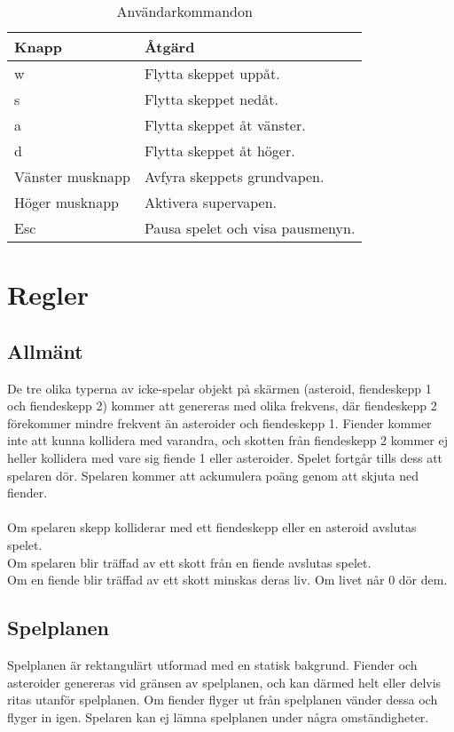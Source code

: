 \documentclass{TDP003mall}
\begin{document}
\begin{table}[!h]
\centering
\begin{tabularx}{255pt}{|l|l|}
\hline
Knapp & Åtgärd \\\hline
w & Flytta skeppet uppåt. \\
s & Flytta skeppet nedåt. \\
a & Flytta skeppet åt vänster. \\
d & Flytta skeppet åt höger. \\
Vänster musknapp & Avfyra skeppets grundvapen. \\
Höger musknapp & Aktivera supervapen. \\
Esc & Pausa spelet och visa pausmenyn.\\
\hline
\end{tabularx}
\caption{Användarkommandon}
\end{table}

\section{Regler}

\subsection{Allmänt}
De tre olika typerna av icke-spelar objekt på skärmen (asteroid, fiendeskepp 1 och fiendeskepp 2) 
kommer att genereras med olika frekvens, där fiendeskepp 2 förekommer mindre frekvent än 
asteroider och 
fiendeskepp 1. Fiender kommer inte att kunna kollidera med varandra, och skotten från
 fiendeskepp 2
kommer ej heller kollidera med vare sig fiende 1 eller asteroider. Spelet
 fortgår tills dess att spelaren dör.
Spelaren kommer att ackumulera poäng genom att skjuta ned fiender. \\ \\
Om spelaren skepp kolliderar med ett fiendeskepp eller en asteroid avslutas spelet.\\
Om spelaren blir träffad av ett skott från en fiende avslutas spelet. \\
Om en fiende blir träffad av ett skott minskas deras liv. Om livet når 0 dör dem. \\

\subsection{Spelplanen}
Spelplanen är rektangulärt utformad med en statisk bakgrund. Fiender och asteroider genereras vid gränsen
av spelplanen, och kan därmed helt eller delvis ritas utanför spelplanen. Om fiender flyger ut från
spelplanen vänder dessa och flyger in igen. Spelaren kan ej lämna spelplanen under några omständigheter.
\end{document}
